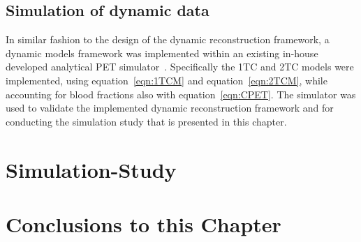 \subsection{Simulation of dynamic data}
In similar fashion to the design of the dynamic reconstruction framework, a dynamic models framework was implemented within an existing in-house developed analytical PET simulator~\cite{Stute2015}. Specifically the 1TC and 2TC models were implemented, using equation~\ref{eqn:1TCM} and equation~\ref{eqn:2TCM}, while accounting for blood fractions also with equation~\ref{eqn:CPET}. 
The simulator was used to validate the implemented dynamic reconstruction framework and for conducting the simulation study that is presented in this chapter.

\section{Simulation-Study}






\newpage





\section{Conclusions to this Chapter}